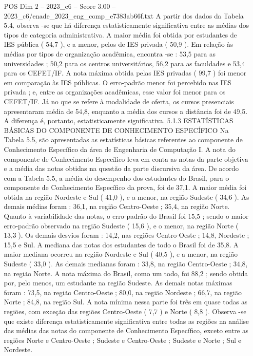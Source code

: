 \begin{textsample}{POS Dim 2 – 2023\_c6 – Score 3.00 – 2023\_c6/enade\_2023\_eng\_comp\_e7383ab66f.txt}
A partir dos dados da Tabela 5.4, observa -se que há diferença estatisticamente significativa entre as médias dos tipos de categoria administrativa.
A maior média foi obtida por estudantes de IES pública ( 54,7 ), e a menor, pelos de IES privada ( 50,9 ).
Em relação às médias por tipos de organização acadêmica, encontra -se : 53,5 para as universidades ; 50,2 para os centros universitários, 56,2 para as faculdades e 53,4 para os CEFET/IF.
A nota máxima obtida pelas IES privadas ( 99,7 ) foi menor em comparação às IES públicas.
O erro-padrão menor foi percebido nas IES privada ; e, entre as organizações acadêmicas, esse valor foi menor para os CEFET/IF.
Já no que se refere à modalidade de oferta, os cursos presenciais apresentaram média de 54,8, enquanto a média dos cursos a distância foi de 49,5.
A diferença é, portanto, estatisticamente significativa. 5.1.3 ESTATÍSTICAS BÁSICAS DO COMPONENTE DE CONHECIMENTO ESPECÍFICO Na Tabela 5.5, são apresentadas as estatísticas básicas referentes ao componente de Conhecimento Específico da área de Engenharia de Computação I.
A nota do componente de Conhecimento Específico leva em conta as notas da parte objetiva e a média das notas obtidas na questão da parte discursiva da área.
De acordo com a Tabela 5.5, a média do desempenho dos estudantes do Brasil, para o componente de Conhecimento Específico da prova, foi de 37,1.
A maior média foi obtida na região Nordeste e Sul ( 41,0 ), e a menor, na região Sudeste ( 34,6 ).
As demais médias foram : 36,1, na região Centro-Oeste ; 35,4, na região Norte.
Quanto à variabilidade das notas, o erro-padrão do Brasil foi 15,5 ; sendo o maior erro-padrão observado na região Sudeste ( 15,6 ), e o menor, na região Norte ( 13,3 ).
Os demais desvios foram : 14,2, nas regiões Centro-Oeste ; 14,8, Nordeste ; 15,5 e Sul.
A mediana das notas dos estudantes de todo o Brasil foi de 35,8.
A maior mediana ocorreu na região Nordeste e Sul ( 40,5 ), e a menor, na região Sudeste ( 33,0 ).
As demais medianas foram : 33,8, na região Centro-Oeste ; 34,8, na região Norte.
A nota máxima do Brasil, como um todo, foi 88,2 ; sendo obtida por, pelo menos, um estudante na região Sudeste.
As demais notas máximas foram : 73,5, na região Centro-Oeste ; 80,0, na região Nordeste ; 66,7, na região Norte ; 84,8, na região Sul.
A nota mínima nessa parte foi três em quase todas as regiões, com exceção das regiões Centro-Oeste ( 7,7 ) e Norte ( 8,8 ).
Observa -se que existe diferença estatisticamente significativa entre todas as regiões na análise das médias das notas do componente de Conhecimento Específico, exceto entre as regiões Norte e Centro-Oeste ; Sudeste e Centro-Oeste ; Sudeste e Norte ; Sul e Nordeste.

\end{textsample}
